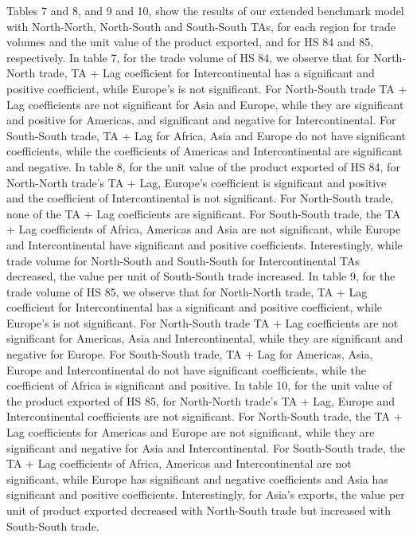 Tables 7 and 8, and 9 and 10, show the results of our extended benchmark
model with North-North, North-South and South-South TAs, for each region
for trade volumes and the unit value of the product exported, and for HS
84 and 85, respectively. In table 7, for the trade volume of HS 84, we
observe that for North-North trade, TA + Lag coefficient for
Intercontinental has a significant and positive coefficient, while
Europe's is not significant. For North-South trade TA + Lag coefficients
are not significant for Asia and Europe, while they are significant and
positive for Americas, and significant and negative for
Intercontinental. For South-South trade, TA + Lag for Africa, Asia and
Europe do not have significant coefficients, while the coefficients of
Americas and Intercontinental are significant and negative. In table 8,
for the unit value of the product exported of HS 84, for North-North
trade's TA + Lag, Europe's coefficient is significant and positive and
the coefficient of Intercontinental is not significant. For North-South
trade, none of the TA + Lag coefficients are significant. For
South-South trade, the TA + Lag coefficients of Africa, Americas and
Asia are not significant, while Europe and Intercontinental have
significant and positive coefficients. Interestingly, while trade volume
for North-South and South-South for Intercontinental TAs decreased, the
value per unit of South-South trade increased. In table 9, for the trade
volume of HS 85, we observe that for North-North trade, TA + Lag
coefficient for Intercontinental has a significant and positive
coefficient, while Europe's is not significant. For North-South trade TA
+ Lag coefficients are not significant for Americas, Asia and
Intercontinental, while they are significant and negative for Europe.
For South-South trade, TA + Lag for Americas, Asia, Europe and
Intercontinental do not have significant coefficients, while the
coefficient of Africa is significant and positive. In table 10, for the
unit value of the product exported of HS 85, for North-North trade's TA
+ Lag, Europe and Intercontinental coefficients are not significant. For
North-South trade, the TA + Lag coefficients for Americas and Europe are
not significant, while they are significant and negative for Asia and
Intercontinental. For South-South trade, the TA + Lag coefficients of
Africa, Americas and Intercontinental are not significant, while Europe
has significant and negative coefficients and Asia has significant and
positive coefficients. Interestingly, for Asia's exports, the value per
unit of product exported decreased with North-South trade but increased
with South-South trade.

